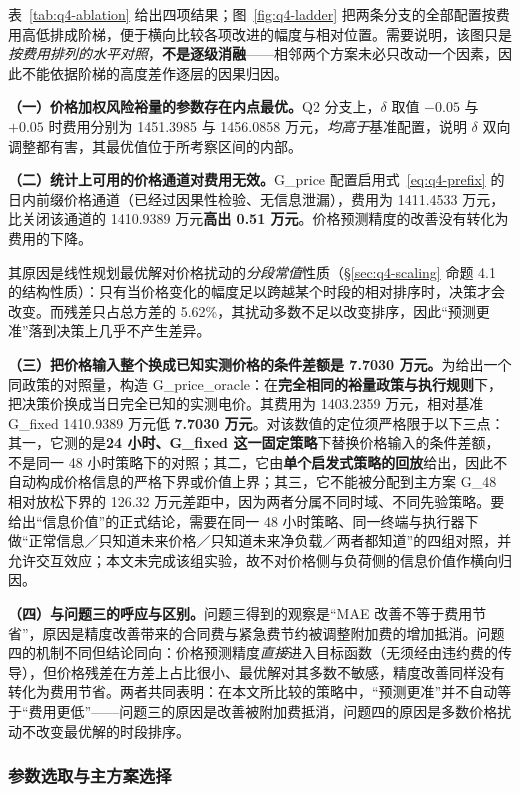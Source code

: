 表~\ref{tab:q4-ablation} 给出四项结果；图~\ref{fig:q4-ladder} 把两条分支的全部配置按费用高低排成阶梯，便于横向比较各项改进的幅度与相对位置。需要说明，该图只是\emph{按费用排列的水平对照}，\textbf{不是逐级消融}——相邻两个方案未必只改动一个因素，因此不能依据阶梯的高度差作逐层的因果归因。

\textbf{（一）价格加权风险裕量的参数存在内点最优。}Q2 分支上，$\delta$ 取值 $-0.05$ 与 $+0.05$ 时费用分别为 1451.3985 与 1456.0858 万元，\emph{均高于}基准配置，说明 $\delta$ 双向调整都有害，其最优值位于所考察区间的内部。

\textbf{（二）统计上可用的价格通道对费用无效。}G\_price 配置启用式~\eqref{eq:q4-prefix} 的日内前缀价格通道（已经过因果性检验、无信息泄漏），费用为 1411.4533 万元，比关闭该通道的 1410.9389 万元\textbf{高出 0.51 万元}。价格预测精度的改善没有转化为费用的下降。

其原因是线性规划最优解对价格扰动的\emph{分段常值}性质（\S\ref{sec:q4-scaling} 命题 4.1 的结构性质）：只有当价格变化的幅度足以跨越某个时段的相对排序时，决策才会改变。而残差只占总方差的 5.62\%，其扰动多数不足以改变排序，因此``预测更准''落到决策上几乎不产生差异。

\textbf{（三）把价格输入整个换成已知实测价格的条件差额是 7.7030 万元。}为给出一个同政策的对照量，构造 G\_price\_oracle：在\textbf{完全相同的裕量政策与执行规则}下，把决策价换成当日完全已知的实测电价。其费用为 1403.2359 万元，相对基准 G\_fixed 1410.9389 万元低 \textbf{7.7030 万元}。对该数值的定位须严格限于以下三点：其一，它测的是\textbf{24 小时、G\_fixed 这一固定策略}下替换价格输入的条件差额，不是同一 48 小时策略下的对照；其二，它由\textbf{单个启发式策略的回放}给出，因此不自动构成价格信息的严格下界或价值上界；其三，它不能被分配到主方案 G\_48 相对放松下界的 126.32 万元差距中，因为两者分属不同时域、不同先验策略。要给出``信息价值''的正式结论，需要在同一 48 小时策略、同一终端与执行器下做``正常信息／只知道未来价格／只知道未来净负载／两者都知道''的四组对照，并允许交互效应；本文未完成该组实验，故不对价格侧与负荷侧的信息价值作横向归因。

\textbf{（四）与问题三的呼应与区别。}问题三得到的观察是``MAE 改善不等于费用节省''，原因是精度改善带来的合同费与紧急费节约被调整附加费的增加抵消。问题四的机制不同但结论同向：价格预测精度\emph{直接}进入目标函数（无须经由违约费的传导），但价格残差在方差上占比很小、最优解对其多数不敏感，精度改善同样没有转化为费用节省。两者共同表明：在本文所比较的策略中，``预测更准''并不自动等于``费用更低''——问题三的原因是改善被附加费抵消，问题四的原因是多数价格扰动不改变最优解的时段排序。

\subsubsection{参数选取与主方案选择}
\label{sec:q4-grid}

